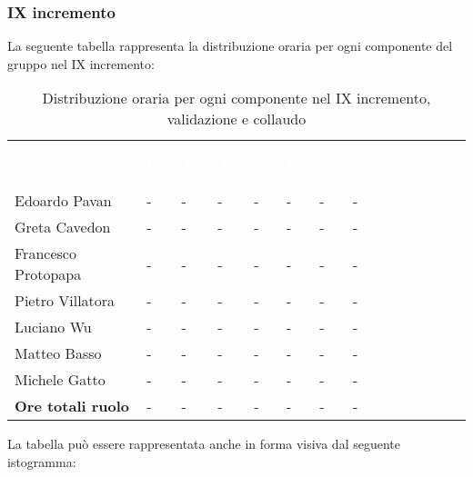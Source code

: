 \subsubsection{IX incremento}
La seguente tabella rappresenta la distribuzione oraria per ogni componente del gruppo nel IX incremento:
\begin{table}[!htbp]
\begin{center}
\renewcommand{\arraystretch}{1.25}
\begin{tabular}{ m{}<{\centering}  m{}<{\centering} m{}<{\centering} m{}<{\centering}  m{}<{\centering}  m{}<{\centering}  m{}<{\centering}  m{}<{\centering}   }
	\rowcolor{darkblue}
	\textcolor{white}{\textbf{Componente}} &\textcolor{white}{\textbf{Re}}&\textcolor{white}{\textbf{Ad}}&\textcolor{white}{\textbf{An}}&\textcolor{white}{\textbf{Pt}}&\textcolor{white}{\textbf{Pr}}&\textcolor{white}{\textbf{Ve}}&\textcolor{white}{\textbf{Ore complessive}}\\ 

	Edoardo Pavan & - & - & - & - & - & - & -\\	

	Greta Cavedon & - & - & - & - & - & - & -\\
	
	Francesco Protopapa & - & - & - & - & - & - & -\\
	
	Pietro Villatora & - & - & - & - & - & - & -\\
	
	Luciano Wu & - & - & - & - & - & - & -\\
	
	Matteo Basso & - & - & - & - & - & - & -\\
	
	Michele Gatto & - & - & - & - & - & - & -\\
	
	\textbf{Ore totali ruolo} & - & - & - & - & - & - & -\\

\end{tabular}
\caption{Distribuzione oraria per ogni componente nel IX incremento,  validazione e collaudo}
\end{center}
\end{table}

La tabella può essere rappresentata anche in forma visiva dal seguente istogramma:

